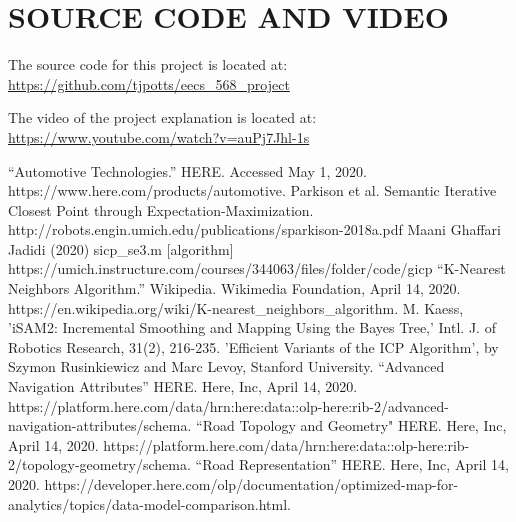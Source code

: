 \documentclass[letterpaper, 10 pt, conference]{ieeeconf}  %
\begin{document}
\section{SOURCE CODE AND VIDEO}

The source code for this project is located at: \url{https://github.com/tjpotts/eecs_568_project}

The video of the project explanation is located at: \url{https://www.youtube.com/watch?v=auPj7Jhl-1s}



\addtolength{\textheight}{-8cm}   %


\begin{thebibliography}{99}

 “Automotive Technologies.” HERE. Accessed May 1, 2020. https://www.here.com/products/automotive.
 Parkison et al. Semantic Iterative Closest Point through Expectation-Maximization. http://robots.engin.umich.edu/publications/sparkison-2018a.pdf
 Maani Ghaffari Jadidi (2020) sicp\_se3.m [algorithm] https://umich.instructure.com/courses/344063/files/folder/code/gicp
 “K-Nearest Neighbors Algorithm.” Wikipedia. Wikimedia Foundation, April 14, 2020. https://en.wikipedia.org/wiki/K-nearest\_neighbors\_algorithm.
 M. Kaess, 'iSAM2: Incremental Smoothing and Mapping Using the Bayes Tree,' Intl. J. of Robotics Research, 31(2), 216-235.
'Efficient Variants of the ICP Algorithm', by Szymon Rusinkiewicz and Marc Levoy, Stanford University.
 “Advanced Navigation Attributes” HERE. Here, Inc, April 14, 2020.  https://platform.here.com/data/hrn:here:data::olp-here:rib-2/advanced-navigation-attributes/schema.
 “Road Topology and Geometry" HERE. Here, Inc, April 14, 2020.  https://platform.here.com/data/hrn:here:data::olp-here:rib-2/topology-geometry/schema.
 “Road Representation” HERE. Here, Inc, April 14, 2020.  https://developer.here.com/olp/documentation/optimized-map-for-analytics/topics/data-model-comparison.html.


\end{thebibliography}
\end{document}
